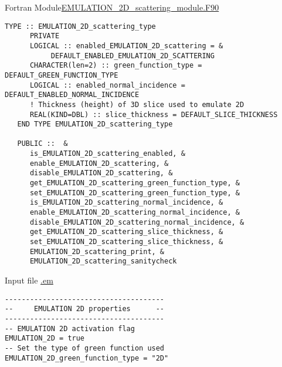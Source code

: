 %
%
% 

  \begin{frame}{Fortran Module}{\url{EMULATION_2D_scattering_module.F90}}

    \begin{lstlisting}[style=myFORTRANcodeS]
   TYPE :: EMULATION_2D_scattering_type
      PRIVATE 
      LOGICAL :: enabled_EMULATION_2D_scattering = &
           DEFAULT_ENABLED_EMULATION_2D_SCATTERING
      CHARACTER(len=2) :: green_function_type = DEFAULT_GREEN_FUNCTION_TYPE
      LOGICAL :: enabled_normal_incidence = DEFAULT_ENABLED_NORMAL_INCIDENCE
      ! Thickness (height) of 3D slice used to emulate 2D
      REAL(KIND=DBL) :: slice_thickness = DEFAULT_SLICE_THICKNESS 
   END TYPE EMULATION_2D_scattering_type

   PUBLIC ::  &
      is_EMULATION_2D_scattering_enabled, &
      enable_EMULATION_2D_scattering, &
      disable_EMULATION_2D_scattering, &
      get_EMULATION_2D_scattering_green_function_type, &
      set_EMULATION_2D_scattering_green_function_type, &
      is_EMULATION_2D_scattering_normal_incidence, &
      enable_EMULATION_2D_scattering_normal_incidence, &
      disable_EMULATION_2D_scattering_normal_incidence, &
      get_EMULATION_2D_scattering_slice_thickness, &
      set_EMULATION_2D_scattering_slice_thickness, &
      EMULATION_2D_scattering_print, &
      EMULATION_2D_scattering_sanitycheck         
    \end{lstlisting}


   \framebreak %

   
   \begin{block}{Input file \url{.em}} 
     \begin{lstlisting}[basicstyle=\ttfamily\footnotesize,tabsize=3,frame=none]
--------------------------------------
--     EMULATION 2D properties      --
--------------------------------------
-- EMULATION 2D activation flag
EMULATION_2D = true
-- Set the type of green function used
EMULATION_2D_green_function_type = "2D"
     \end{lstlisting}
   \end{block}


\end{frame}

